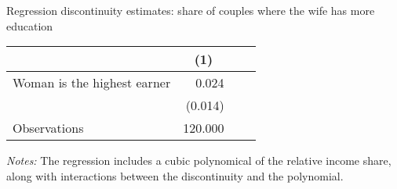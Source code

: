 \begin{center}
\begin{adjustbox}{max width=.9\textwidth}
\begin{threeparttable}[H]
\caption{Regression discontinuity estimates: share of couples where the wife has more education}
\label{tab:table_3}
\begin{tabular}{lrrr}
\toprule
\toprule
\textbf{}&\multicolumn{1}{c}{(1)} \\
\midrule
Woman is the highest earner&       0.024\sym{*}  \\
                    &     (0.014)         \\
\midrule Observations&     120.000         \\
\bottomrule
\bottomrule
\end{tabular}
\begin{tablenotes}
\item \footnotesize \textit{Notes:} The regression includes a cubic polynomical of the relative income share, along with interactions between the discontinuity and the polynomial. 
\end{tablenotes}
\end{threeparttable}
\end{adjustbox}
\end{center}
